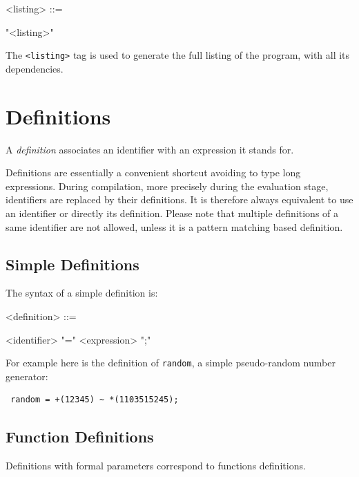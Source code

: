 \documentclass[a4paper]{book}
\begin{document}
\begin{grammar}
  <listing> ::= 
  \begin{syntdiag}
    "<listing>"
  \end{syntdiag}
\end{grammar}

The \lstinline'<listing>' tag is used to generate the full listing of the \faust program, with all its dependencies.



\section{Definitions}

A \textit{definition} associates an identifier with an expression it stands for. 

Definitions are essentially a convenient shortcut avoiding to type long expressions. During compilation, more precisely during the evaluation stage, identifiers are replaced by their definitions. It is therefore always equivalent to use an identifier or directly its definition. Please note that multiple definitions of a same identifier are not allowed, unless it is a pattern matching based definition.

\subsection{Simple Definitions}

The syntax of a simple definition is:

\begin{grammar}
  <definition> ::= 
  \begin{syntdiag}
    <identifier> "=" <expression> ";"
  \end{syntdiag}
\end{grammar}

For example here is the definition of \lstinline'random', a simple pseudo-random number generator:

\begin{lstlisting}
 random = +(12345) ~ *(1103515245);
\end{lstlisting}


\subsection{Function Definitions}

Definitions with formal parameters correspond to functions definitions.
\end{document}
